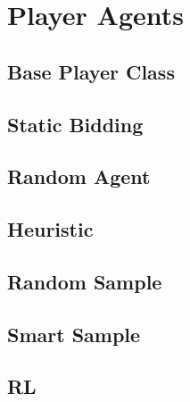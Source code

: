 \chapter{Player Agents}
\section{Base Player Class}
\section{Static Bidding}
\section{Random Agent}
\section{Heuristic}
\section{Random Sample}
\section{Smart Sample}
\section{RL}